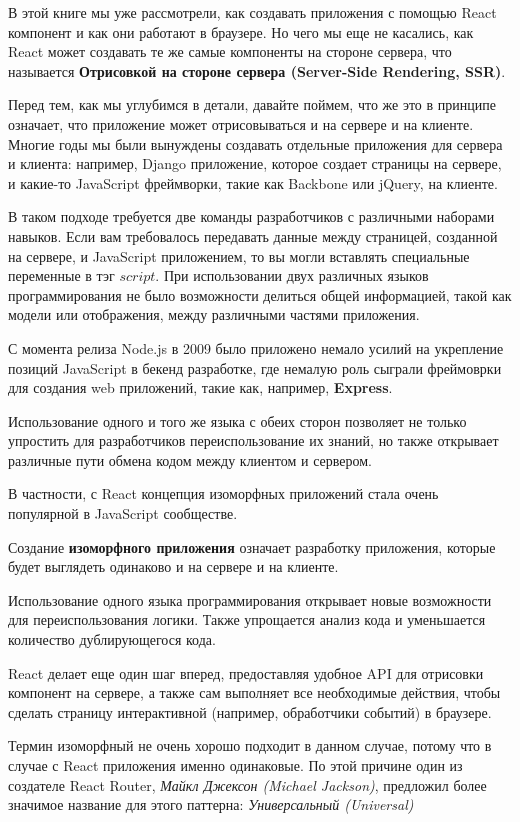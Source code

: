 В этой книге мы уже рассмотрели, как создавать приложения с помощью React компонент и как они работают в браузере. Но чего мы еще не касались, как React может создавать те же самые компоненты на стороне сервера, что называется \textbf{Отрисовкой на стороне сервера (Server-Side Rendering, SSR)}.

Перед тем, как мы углубимся в детали, давайте поймем, что же это в принципе означает, что приложение может отрисовываться и на сервере и на клиенте. Многие годы мы были вынуждены создавать отдельные приложения для сервера и клиента: например, Django приложение, которое создает страницы на сервере, и какие-то JavaScript фреймворки, такие как Backbone или jQuery, на клиенте. 

В таком подходе требуется две команды разработчиков с различными наборами навыков. Если вам требовалось передавать данные между страницей, созданной на сервере, и JavaScript приложением, то вы могли вставлять специальные переменные в тэг $script$. При использовании двух различных языков программирования не было возможности делиться общей информацией, такой как модели или отображения, между различными частями приложения.

С момента релиза Node.js в 2009 было приложено немало усилий на укрепление позиций JavaScript в бекенд разработке, где немалую роль сыграли фреймоврки для создания web приложений, такие как, например, \textbf{Express}.

Использование одного и того же языка с обеих сторон позволяет не только упростить для разработчиков переиспользование их знаний, но также открывает различные пути обмена кодом между клиентом и сервером.

В частности, с React концепция изоморфных приложений стала очень популярной в JavaScript сообществе.

Создание \textbf{изоморфного приложения} означает разработку приложения, которые будет выглядеть одинаково и на сервере и на клиенте.

Использование одного языка программирования открывает новые возможности для переиспользования логики. Также упрощается анализ кода и уменьшается количество дублирующегося кода.

React делает еще один шаг вперед, предоставляя удобное API для отрисовки компонент на сервере, а также сам выполняет все необходимые действия, чтобы сделать страницу интерактивной (например, обработчики событий) в браузере.

Термин изоморфный не очень хорошо подходит в данном случае, потому что в случае с React приложения именно одинаковые. По этой причине один из создателе React Router, \textit{Майкл Джексон (Michael Jackson)}, предложил более значимое название для этого паттерна: \textit{Универсальный (Universal)}

